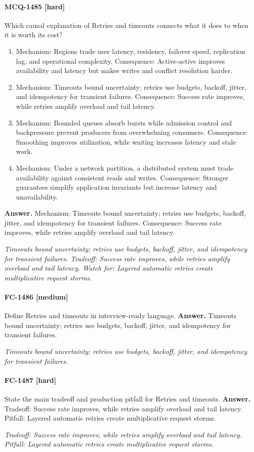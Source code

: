 \paragraph{MCQ-1485 [hard]} Which causal explanation of Retries and timeouts connects what it does to when it is worth its cost?
\begin{enumerate}[label=\Alph*.]
\item Mechanism: Regions trade user latency, residency, failover speed, replication lag, and operational complexity. Consequence: Active-active improves availability and latency but makes writes and conflict resolution harder.
\item Mechanism: Timeouts bound uncertainty; retries use budgets, backoff, jitter, and idempotency for transient failures. Consequence: Success rate improves, while retries amplify overload and tail latency.
\item Mechanism: Bounded queues absorb bursts while admission control and backpressure prevent producers from overwhelming consumers. Consequence: Smoothing improves utilization, while waiting increases latency and stale work.
\item Mechanism: Under a network partition, a distributed system must trade availability against consistent reads and writes. Consequence: Stronger guarantees simplify application invariants but increase latency and unavailability.
\end{enumerate}
\noindent\textbf{Answer.} Mechanism: Timeouts bound uncertainty; retries use budgets, backoff, jitter, and idempotency for transient failures. Consequence: Success rate improves, while retries amplify overload and tail latency.
\par\textit{Timeouts bound uncertainty; retries use budgets, backoff, jitter, and idempotency for transient failures. Tradeoff: Success rate improves, while retries amplify overload and tail latency. Watch for: Layered automatic retries create multiplicative request storms.}
\paragraph{FC-1486 [medium]} Define Retries and timeouts in interview-ready language.
\noindent\textbf{Answer.} Timeouts bound uncertainty; retries use budgets, backoff, jitter, and idempotency for transient failures.
\par\textit{Timeouts bound uncertainty; retries use budgets, backoff, jitter, and idempotency for transient failures.}
\paragraph{FC-1487 [hard]} State the main tradeoff and production pitfall for Retries and timeouts.
\noindent\textbf{Answer.} Tradeoff: Success rate improves, while retries amplify overload and tail latency. Pitfall: Layered automatic retries create multiplicative request storms.
\par\textit{Tradeoff: Success rate improves, while retries amplify overload and tail latency. Pitfall: Layered automatic retries create multiplicative request storms.}
